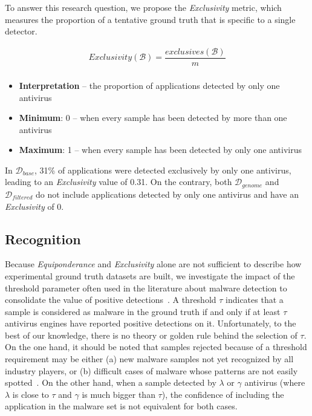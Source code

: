 To answer this research question, we propose the {\em Exclusivity} metric, which measures the proportion of a tentative ground truth that is specific to a single detector.

\begin{mdframed}[hidealllines=true,nobreak=true]
\begin{gather*}
	Exclusivity(\mathcal{B}) = \dfrac{exclusives(\mathcal{B})}{m} \\
\end{gather*}

\begin{itemize}
	\item{\textbf{Interpretation}} -- the proportion of applications detected by only one
	      antivirus
	\item{\textbf{Minimum}}: 0 -- when every sample has been detected by more than one antivirus
	\item{\textbf{Maximum}}: 1 -- when every sample has been detected by only one
	      antivirus
\end{itemize}
\end{mdframed}

In $\mathcal{D}_{base}$, 31\% of applications were detected exclusively by only one antivirus, leading to an {\em Exclusivity} value of 0.31.
On the contrary, both $\mathcal{D}_{genome}$ and $\mathcal{D}_{filtered}$ do not include applications detected by only one antivirus and have an \emph{Exclusivity} of 0.
\subsection{Recognition}
Because \emph{Equiponderance} and \emph{Exclusivity} alone are not sufficient to describe how experimental ground truth datasets are built, we investigate the impact of the threshold parameter often used in the literature about malware detection to consolidate the value of positive detections~\cite{arp_drebin:_2014}.
A threshold $\tau$ indicates that a sample is considered as malware in the ground truth if and only if at least $\tau$ antivirus engines have reported positive detections on it.
Unfortunately, to the best of our knowledge, there is no theory or golden rule behind the selection of $\tau$.
On the one hand, it should be noted that samples rejected because of a threshold requirement may be either (a) new malware samples not yet recognized by all industry players, or (b) difficult cases of malware whose patterns are not easily spotted~\cite{kantchelian_better_2015}.
On the other hand, when a sample detected by $\lambda$ or $\gamma$ antivirus (where $\lambda$ is close to $\tau$ and $\gamma$ is much bigger than $\tau$), the confidence of including the application in the malware set is not equivalent for both cases.

